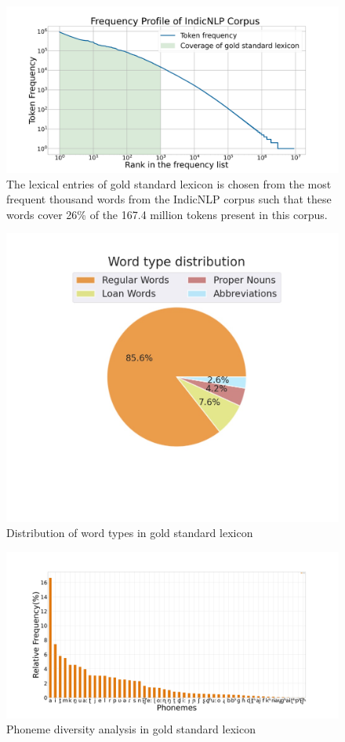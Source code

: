 \begin{figure}[htpb]
	\centering
	\includegraphics[width=0.8\linewidth]{rank.png}
	\caption{The lexical entries of gold standard lexicon is chosen from the most frequent thousand words from the IndicNLP corpus \cite{kunchukuttan2020ai4bharat} such that these words cover 26\% of the 167.4 million tokens present in this corpus.}
	\label{fig:rank}
\end{figure}
\begin{figure}[htpb]
	\centering
	\includegraphics[trim={3cm 8cm 3cm 0cm},clip=true, width=0.8\linewidth]{wordtypes.jpg}
	\caption{Distribution of word types in gold standard lexicon}
	\label{fig:pie-chart}
\end{figure}

\begin{figure}[htpb]
	\centering
	\includegraphics[width=\linewidth]{goldrichness.jpg}
	\caption{Phoneme diversity  analysis in gold standard lexicon}
	\label{fig:goldrichness}
\end{figure}

